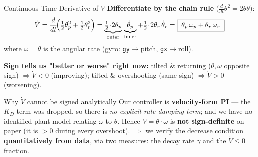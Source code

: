 \documentclass[10pt]{beamer}
\begin{document}
\begin{frame}{Continuous-Time Derivative of $V$}
  \textbf{Differentiate by the chain rule} $\bigl(\tfrac{d}{dt}\theta^2=2\theta\dot\theta\bigr)$:
  \[
    \dot V=\frac{d}{dt}\!\Bigl(\tfrac12\theta_p^2+\tfrac12\theta_r^2\Bigr)
     =\underbrace{\tfrac12\!\cdot\!2\theta_p}_{\text{outer}}\,
       \underbrace{\dot\theta_p}_{\text{inner}}
      +\tfrac12\!\cdot\!2\theta_r\,\dot\theta_r
     =\boxed{\;\theta_p\,\omega_p+\theta_r\,\omega_r\;}
  \]
  where $\omega=\dot\theta$ is the angular rate (gyro: \texttt{gy}$\to$pitch, \texttt{gx}$\to$roll).
 
  \medskip
  \textbf{Sign tells us "better or worse" right now:}
  tilted \& returning ($\theta,\omega$ opposite sign) $\Rightarrow\dot V<0$ (improving);
  tilted \& overshooting (same sign) $\Rightarrow\dot V>0$ (worsening).
 
  \begin{alertblock}{Why $\dot V$ cannot be signed analytically}
    Our controller is \textbf{velocity-form PI} — the $K_D$ term was dropped,
    so there is \emph{no explicit rate-damping term}; and we have no identified
    plant model relating $\omega$ to $\theta$. Hence $\dot V=\theta\!\cdot\!\omega$
    is \textbf{not sign-definite} on paper (it is $>0$ during every overshoot).
    $\Rightarrow$ we verify the decrease condition \textbf{quantitatively from data},
    via two measures: the decay rate $\gamma$ and the $\dot V\le 0$ fraction.
  \end{alertblock}
\end{frame}
\end{document}
